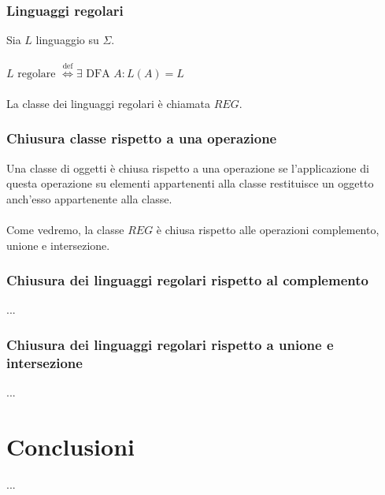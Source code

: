 \documentclass[]{article}
\begin{document}
\newpage
\subsubsection{Linguaggi regolari}

Sia \mbox{$ L $} linguaggio su \mbox{$ \Sigma $}.
\\
\\
\mbox{$ L \text{ regolare }
\overset{\text{def}}{\Leftrightarrow}
\exists \text{ DFA } A \colon L(A) = L $}
\\
\\
La classe dei linguaggi regolari è chiamata \mbox{$ REG $}.



\subsubsection{Chiusura classe rispetto a una operazione}

Una classe di oggetti è chiusa rispetto a una operazione se l'applicazione di questa operazione su
elementi appartenenti alla classe restituisce un oggetto anch'esso appartenente alla classe.
\\
\\
Come vedremo, la classe \mbox{$ REG $} è chiusa rispetto alle operazioni complemento, unione
e intersezione.



\subsubsection{Chiusura dei linguaggi regolari rispetto al complemento}

...



\subsubsection{Chiusura dei linguaggi regolari rispetto a unione e intersezione}

...



\section*{Conclusioni}

...
\end{document}
